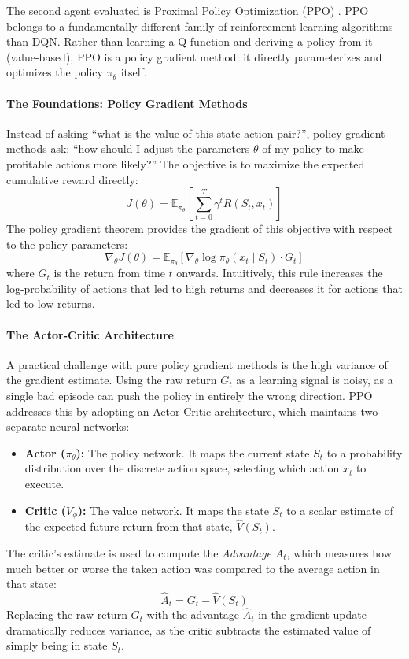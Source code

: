             The second agent evaluated is Proximal Policy Optimization (PPO) \cite{schulman2017proximal}. PPO belongs to a fundamentally different family of reinforcement learning algorithms than DQN. Rather than learning a Q-function and deriving a policy from it (value-based), PPO is a policy gradient method: it directly parameterizes and optimizes the policy $\pi_\theta$ itself.

            \paragraph{The Foundations: Policy Gradient Methods}
            Instead of asking ``what is the value of this state-action pair?'', policy gradient methods ask: ``how should I adjust the parameters $\theta$ of my policy to make profitable actions more likely?'' The objective is to maximize the expected cumulative reward directly:
            \[
                J(\theta) = \mathbb{E}_{\pi_\theta} \left[ \sum_{t=0}^{T} \gamma^t R(S_t, x_t) \right]
            \]
            The policy gradient theorem provides the gradient of this objective with respect to the policy parameters:
            \[
                \nabla_\theta J(\theta) = \mathbb{E}_{\pi_\theta} \left[ \nabla_\theta \log \pi_\theta(x_t \mid S_t) \cdot G_t \right]
            \]
            where $G_t$ is the return from time $t$ onwards. Intuitively, this rule increases the log-probability of actions that led to high returns and decreases it for actions that led to low returns.

            \paragraph{The Actor-Critic Architecture}
            A practical challenge with pure policy gradient methods is the high variance of the gradient estimate. Using the raw return $G_t$ as a learning signal is noisy, as a single bad episode can push the policy in entirely the wrong direction. PPO addresses this by adopting an Actor-Critic architecture, which maintains two separate neural networks:
            \begin{itemize}
                \item \textbf{Actor ($\pi_\theta$):} The policy network. It maps the current state $S_t$ to a probability distribution over the discrete action space, selecting which action $x_t$ to execute.
                \item \textbf{Critic ($V_\phi$):} The value network. It maps the state $S_t$ to a scalar estimate of the expected future return from that state, $\hat{V}(S_t)$.
            \end{itemize}
            The critic's estimate is used to compute the \textit{Advantage} $\hat{A}_t$, which measures how much better or worse the taken action was compared to the average action in that state:
            \[
                \hat{A}_t = G_t - \hat{V}(S_t)
            \]
            Replacing the raw return $G_t$ with the advantage $\hat{A}_t$ in the gradient update dramatically reduces variance, as the critic subtracts the estimated value of simply being in state $S_t$.

